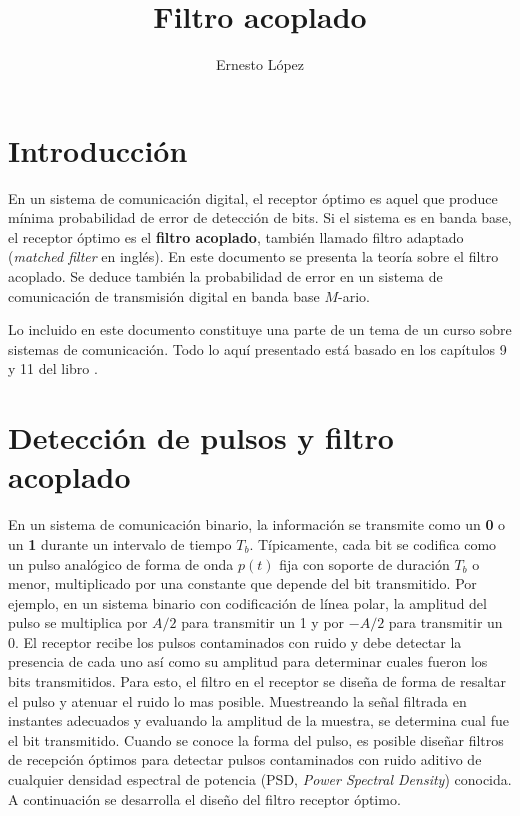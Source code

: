 \documentclass[a4paper]{article}
\title{Filtro acoplado}
\author{Ernesto López}
\begin{document}
 

\maketitle

\section{Introducción}

En un sistema de comunicación digital, el receptor óptimo es aquel que produce mínima probabilidad de error de detección de bits. Si el sistema es en banda base, el receptor óptimo es el \textbf{filtro acoplado}, también llamado filtro adaptado (\emph{matched filter} en inglés). En este documento se presenta la teoría sobre el filtro acoplado. Se deduce también la probabilidad de error en un sistema de comunicación de transmisión digital en banda base \(M\)-ario.

Lo incluido en este documento constituye una parte de un tema de un curso sobre sistemas de comunicación. Todo lo aquí presentado está basado en los capítulos 9 y 11 del libro \cite{Carlson2009}.

\section{Detección de pulsos y filtro acoplado}

En un sistema de comunicación binario, la información se transmite como un \textbf{0} o un \textbf{1} durante un intervalo de tiempo \(T_b\). Típicamente, cada bit se codifica como un pulso analógico de forma de onda \(p(t)\) fija con soporte de duración \(T_b\) o menor, multiplicado por una constante que depende del bit transmitido. Por ejemplo, en un sistema binario con codificación de línea polar, la amplitud del pulso se multiplica por \(A/2\) para transmitir un 1 y por  \(-A/2\) para transmitir un 0. El receptor recibe los pulsos contaminados con ruido y debe detectar la presencia de cada uno así como su amplitud para determinar cuales fueron los bits transmitidos. Para esto, el filtro en el receptor se diseña de forma de resaltar el pulso y atenuar el ruido lo mas posible. Muestreando la señal filtrada en instantes adecuados y evaluando la amplitud de la muestra, se determina cual fue el bit transmitido. Cuando se conoce la forma del pulso, es posible diseñar filtros de recepción óptimos para detectar pulsos contaminados con ruido aditivo de cualquier densidad espectral de potencia  (PSD, \emph{Power Spectral Density}) conocida. A continuación se desarrolla el diseño del filtro receptor óptimo.
\end{document}
